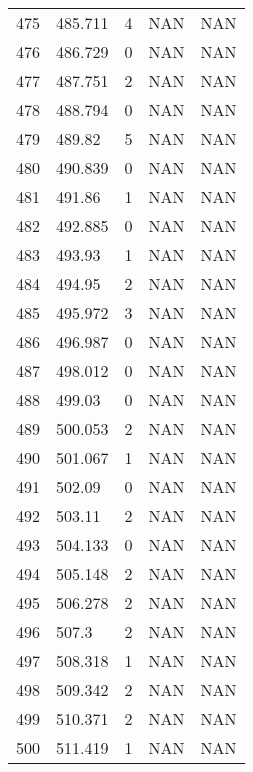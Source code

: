 \documentclass{article}
\begin{document}
\begin{longtable}{@{}lllll@{}}
				475 & 485.711 & 4    & NAN  & NAN  \\
				476 & 486.729 & 0    & NAN  & NAN  \\
				477 & 487.751 & 2    & NAN  & NAN  \\
				478 & 488.794 & 0    & NAN  & NAN  \\
				479 & 489.82  & 5    & NAN  & NAN  \\
				480 & 490.839 & 0    & NAN  & NAN  \\
				481 & 491.86  & 1    & NAN  & NAN  \\
				482 & 492.885 & 0    & NAN  & NAN  \\
				483 & 493.93  & 1    & NAN  & NAN  \\
				484 & 494.95  & 2    & NAN  & NAN  \\
				485 & 495.972 & 3    & NAN  & NAN  \\
				486 & 496.987 & 0    & NAN  & NAN  \\
				487 & 498.012 & 0    & NAN  & NAN  \\
				488 & 499.03  & 0    & NAN  & NAN  \\
				489 & 500.053 & 2    & NAN  & NAN  \\
				490 & 501.067 & 1    & NAN  & NAN  \\
				491 & 502.09  & 0    & NAN  & NAN  \\
				492 & 503.11  & 2    & NAN  & NAN  \\
				493 & 504.133 & 0    & NAN  & NAN  \\
				494 & 505.148 & 2    & NAN  & NAN  \\
				495 & 506.278 & 2    & NAN  & NAN  \\
				496 & 507.3   & 2    & NAN  & NAN  \\
				497 & 508.318 & 1    & NAN  & NAN  \\
				498 & 509.342 & 2    & NAN  & NAN  \\
				499 & 510.371 & 2    & NAN  & NAN  \\
				500 & 511.419 & 1    & NAN  & NAN  \\* \bottomrule
			\end{longtable}
			\newpage
		
\end{document}
